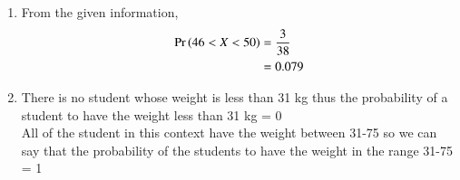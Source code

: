 \begin{enumerate}
\item 
From the given information, 
\begin{align}
\Pr\left(46<X<50\right) &= \frac{3}{38}
\\
&= 0.079
\end{align}

\item There is no student whose weight is less than 31 kg thus the probability of a student to have the weight less than 31 kg = 0\\

All of the student in this context  have the weight between 31-75 so we can say that the probability of the students to have the weight in the range 31-75 = 1
\end{enumerate}
